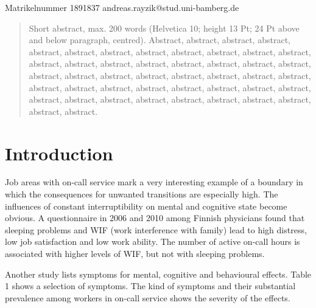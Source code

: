 \documentclass{CML_Seminar_Template}
\begin{document}

\author{Andreas Rayzik}
       {Matrikelnummer 1891837}
       {andreas.rayzik@stud.uni-bamberg.de}

\begin{abstract}
Short abstract, max. 200 words  (Helvetica 10; height 13 Pt; 24 Pt above and below paragraph, centred). Abstract, abstract, abstract, abstract, abstract, abstract, abstract, abstract, abstract, abstract, abstract, abstract, abstract, abstract, abstract, abstract, abstract, abstract, abstract, abstract, abstract, abstract, abstract, abstract, abstract, abstract, abstract, abstract, abstract, abstract, abstract, abstract, abstract, abstract, abstract, abstract, abstract, abstract, abstract, abstract, abstract, abstract, abstract, abstract, abstract, abstract. 
\end{abstract}

\vspace{24pt}

\section{Introduction}

Job areas with on-call service mark a very interesting example of a boundary in which the consequences for unwanted transitions are especially high. The influences of constant interruptibility on mental and cognitive state become obvious. A questionnaire in 2006 and 2010 among Finnish physicians found that sleeping problems and WIF (work interference with family) lead to high distress, low job satisfaction and low work ability. The number of active on-call hours is associated with higher levels of WIF, but not with sleeping problems.
\par
Another study lists symptoms for mental, cognitive and behavioural effects. Table 1 shows a selection of symptoms. The kind of symptoms and their substantial prevalence among workers in on-call service shows the severity of the effects.
\end{document}
